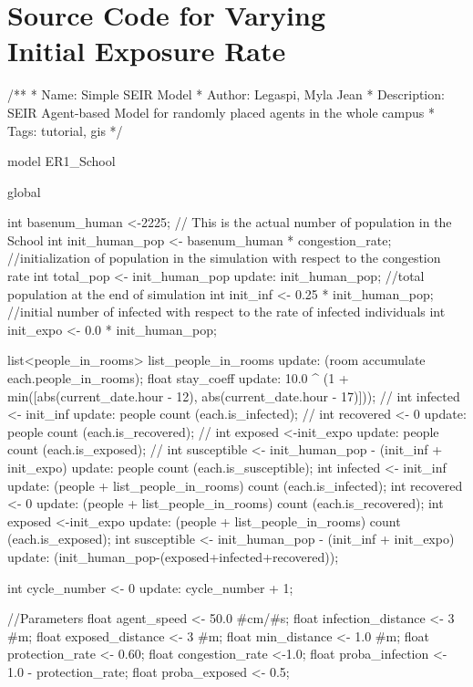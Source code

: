 \chapter{Source Code for Varying \\Initial Exposure Rate}
\scriptsize
\begin{verbatimtab}[4]

    /**
* Name: Simple SEIR Model
* Author: Legaspi, Myla Jean
* Description: SEIR Agent-based Model for randomly placed agents in the whole campus
* Tags: tutorial, gis
*/

model ER1_School

global {
	
	int basenum_human <-2225;  // This is the actual number of population in the School
    int init_human_pop <- basenum_human * congestion_rate; //initialization of population in
     the simulation with respect to the congestion rate
    int total_pop <- init_human_pop update: init_human_pop; //total population at the end of
     simulation
    int init_inf <- 0.25 * init_human_pop; //initial number of infected with respect to the
     rate of infected individuals
    int init_expo <- 0.0 * init_human_pop;
    
	
	
	list<people_in_rooms> list_people_in_rooms update: (room accumulate each.people_in_rooms);
	float stay_coeff update: 10.0 ^ (1 + min([abs(current_date.hour - 12), abs(current_date.hour - 17)]));
//	int infected <- init_inf update: people count (each.is_infected);
//	int recovered <- 0 update: people count (each.is_recovered);
//	int exposed <-init_expo update: people count (each.is_exposed);
//	int susceptible <- init_human_pop - (init_inf + init_expo) update: people count (each.is_susceptible);
	int infected <- init_inf update: (people + list_people_in_rooms) count (each.is_infected);
	int recovered <- 0 update: (people + list_people_in_rooms) count (each.is_recovered);
	int exposed <-init_expo update: (people + list_people_in_rooms) count (each.is_exposed);
	int susceptible <- init_human_pop - (init_inf + init_expo) update: (init_human_pop-(exposed+infected+recovered));

	int cycle_number <- 0 update: cycle_number + 1;
	
   //Parameters 
    float agent_speed <- 50.0 #cm/#s;    
    float infection_distance <- 3 #m;
    float exposed_distance <- 3 #m;
    float min_distance <- 1.0 #m;
    float protection_rate <- 0.60;
    float congestion_rate <-1.0;  
    float proba_infection <- 1.0 - protection_rate;
    float proba_exposed <- 0.5;
    
}
\end{verbatimtab}
